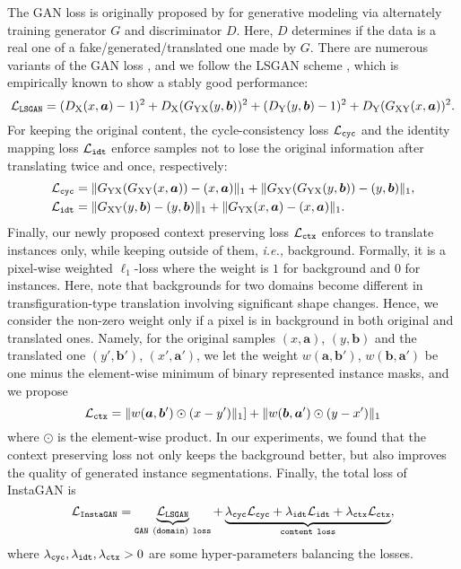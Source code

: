 \documentclass{article} \usepackage{iclr2019_conference,times}
\DeclarePairedDelimiter\norm{\lVert}{\rVert}
\begin{document}
The GAN loss is originally proposed by \citet{goodfellow2014generative}
for generative modeling via alternately training generator $G$ and discriminator $D$.
Here, $D$ determines if the data is a real one of a fake/generated/translated one made by $G$.
There are numerous variants of the GAN loss \citep{nowozin2016f, arjovsky2017wasserstein, li2017mmd, mroueh2017sobolev}, and we follow the LSGAN scheme \citep{mao2017least}, which is empirically known to show a stably good performance:
\begin{equation}
    \mathcal{L}_{\tt LSGAN} = 
	(D_\textrm{X}(x,\bm{a})-1)^2 + D_\textrm{X}(G_\textrm{YX}(y,\bm{b}))^2 + (D_\textrm{Y}(y,\bm{b})-1)^2 + D_\textrm{Y}(G_\textrm{XY}(x,\bm{a}))^2.
\label{eq:gan}
\end{equation}
For keeping the original content,
the cycle-consistency loss $\mathcal{L}_{\tt cyc}$ and 
the identity mapping loss $\mathcal{L}_{\tt idt}$
enforce samples not to lose the original information
after translating twice and once, respectively:
\begin{align}
	\mathcal{L}_{\tt cyc}
	&= \norm{G_\textrm{YX}(G_\textrm{XY}(x,\bm{a}))-(x,\bm{a})}_1 + \norm{G_\textrm{XY}(G_\textrm{YX}(y,\bm{b}))-(y,\bm{b})}_1,
\label{eq:cyc}\\
	\mathcal{L}_{\tt idt}
	&= \norm{G_\textrm{XY}(y,\bm{b})-(y,\bm{b})}_1 + \norm{G_\textrm{YX}(x,\bm{a})-(x,\bm{a})}_1.
\label{eq:idt}
\end{align}
Finally, our newly proposed context preserving loss $\mathcal{L}_{\tt ctx}$
enforces to translate instances only, while keeping outside of them, \textit{i.e.,} background.
Formally, it is a pixel-wise weighted $\ell_1$-loss where the weight is
$1$ for background and $0$ for instances. Here, note that backgrounds for two domains become different in transfiguration-type translation involving significant shape changes. 
Hence, we consider the non-zero weight only if a pixel is in background
in both original and translated ones. Namely,  for the original samples $(x, \bm{a})$, $(y, \bm{b})$ and the translated one $(y', \bm{b}')$, $(x', \bm{a}')$, we let the weight $w(\bm{a},\bm{b}')$, $w(\bm{b},\bm{a}')$
be one minus
the element-wise minimum of binary represented instance masks,
and we propose
\begin{equation}
	\mathcal{L}_{\tt ctx}
	= \norm{w(\bm{a},\bm{b}') \odot (x - y')}_1] + \norm{w(\bm{b}, \bm{a}') \odot (y - x')}_1
	\label{eq:ctx}
\end{equation}
where $\odot$ is the element-wise product.
In our experiments,
we found that
the context preserving loss not only keeps the background better, but also improves the quality of generated instance segmentations.
Finally, the total loss of InstaGAN is
\begin{equation}
	\mathcal{L}_{\tt InstaGAN} = \underbrace{\mathcal{L}_{\tt LSGAN}}_{\tt GAN~(domain)~loss} + 
	\underbrace{\lambda_{\tt cyc} \mathcal{L}_{\tt cyc} + \lambda_{\tt idt} \mathcal{L}_{\tt idt}
	+ \lambda_{\tt ctx} \mathcal{L}_{\tt ctx}}_{\tt content~loss},
	\label{eq:loss}
\end{equation}
where
$\lambda_{\tt cyc}, \lambda_{\tt idt}, \lambda_{\tt ctx}>0$ are 
some hyper-parameters balancing the losses.
\end{document}
